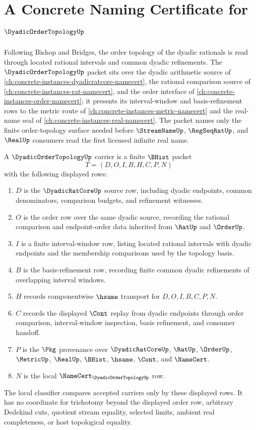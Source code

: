 \chapter{A Concrete Naming Certificate for $\DyadicOrderTopologyUp$}
\label{ch:concrete-instances-dyadic-order-topology-namecert}

Following Bishop and Bridges, the order topology of the dyadic rationals is read through located rational intervals and common dyadic refinements. The $\DyadicOrderTopologyUp$ packet sits over the dyadic arithmetic source of \autoref{ch:concrete-instances-dyadicratcore-namecert}, the rational comparison source of \autoref{ch:concrete-instances-rat-namecert}, and the order interface of \autoref{ch:concrete-instances-order-namecert}; it presents its interval-window and basis-refinement rows to the metric route of \autoref{ch:concrete-instances-metric-namecert} and the real-name seal of \autoref{ch:concrete-instances-real-namecert}. The packet names only the finite order-topology surface needed before $\StreamNameUp$, $\RegSeqRatUp$, and $\RealUp$ consumers read the first licensed infinite real name.

\begin{definition}
\label{def:dyadic-order-topology-carrier}
A $\DyadicOrderTopologyUp$ carrier is a finite $\BHist$ packet
$$
T=(D,O,I,B,H,C,P,N)
$$
with the following displayed rows:
\begin{enumerate}
\item $D$ is the $\DyadicRatCoreUp$ source row, including dyadic endpoints, common denominators, comparison budgets, and refinement witnesses.
\item $O$ is the order row over the same dyadic source, recording the rational comparison and endpoint-order data inherited from $\RatUp$ and $\OrderUp$.
\item $I$ is a finite interval-window row, listing located rational intervals with dyadic endpoints and the membership comparisons used by the topology basis.
\item $B$ is the basis-refinement row, recording finite common dyadic refinements of overlapping interval windows.
\item $H$ records componentwise $\hsame$ transport for $D,O,I,B,C,P,N$.
\item $C$ records the displayed $\Cont$ replay from dyadic endpoints through order comparison, interval-window inspection, basis refinement, and consumer handoff.
\item $P$ is the $\Pkg$ provenance over $\DyadicRatCoreUp$, $\RatUp$, $\OrderUp$, $\MetricUp$, $\RealUp$, $\BHist$, $\hsame$, $\Cont$, and $\NameCert$.
\item $N$ is the local $\NameCert_{\DyadicOrderTopologyUp}$ row.
\end{enumerate}
The local classifier compares accepted carriers only by these displayed rows. It has no coordinate for trichotomy beyond the displayed order row, arbitrary Dedekind cuts, quotient stream equality, selected limits, ambient real completeness, or host topological equality.
\end{definition}

